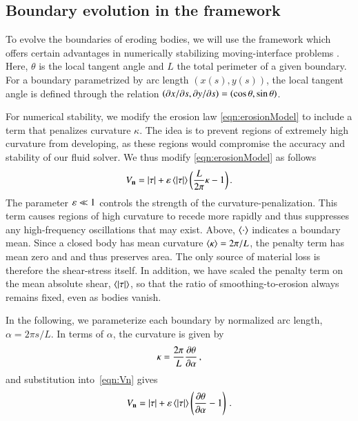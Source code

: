 \documentclass[preprint, 10pt]{elsarticle}
\begin{document}
\subsection{Boundary evolution in the {\thL} framework} 
\label{sec:thetaL}

To evolve the boundaries of eroding bodies, we will use the {\thL} framework which offers certain advantages in numerically stabilizing moving-interface problems \cite{hou-low-she1994}. Here, $\theta$ is the local tangent angle and $L$ the total perimeter of a given boundary. For a boundary parametrized by arc length $(x(s),y(s))$, the local tangent angle is defined through the relation $\left( \partial {x}/\partial {s}, \partial {y}/\partial {s} \right) = \left(\cos \theta, \sin
\theta \right)$.

For numerical stability, we modify the erosion law \eqref{eqn:erosionModel} to include a term that penalizes curvature $\kappa$. The idea is to prevent regions of extremely high curvature from developing, as these regions would compromise the accuracy and stability of our fluid solver. We thus modify \eqref{eqn:erosionModel} as follows
\begin{align}
\label{eqn:Vn}
V_{\mathbf{n}} = \lvert \tau \rvert + \varepsilon \left< \lvert \tau \rvert \right> \left( \frac{L }{2\pi} \kappa - 1 \right).
\end{align}
The parameter $\varepsilon \ll 1$ controls the strength of the curvature-penalization. This term causes regions of high curvature to recede more rapidly and thus suppresses any high-frequency oscillations that may exist. Above, $\left< \cdot \right>$ indicates a boundary mean. Since a closed body has mean curvature $\left< \kappa \right> = 2\pi / L$, the penalty term has mean zero and and thus preserves area. The only source of material loss is therefore the shear-stress itself. In addition, we have scaled the penalty term on the mean absolute shear, $\left< \lvert \tau \rvert \right>$, so that the ratio of smoothing-to-erosion always remains fixed, even as bodies vanish.

In the following, we parameterize each boundary by normalized arc length, $\alpha = 2 \pi s / L$. In terms of $\alpha$, the curvature is given by
\begin{align}
\kappa = \frac{2 \pi}{L} \frac{\partial \theta}{\partial \alpha} \, ,
\end{align}
and substitution into~\eqref{eqn:Vn} gives
\begin{align}
\label{eqn:Vn2}
V_{\mathbf{n}} = \lvert \tau \rvert +  \varepsilon \left< \lvert \tau \rvert \right>   \left(\frac{\partial \theta}{\partial \alpha} - 1 \right) \, .
\end{align}
\end{document}
